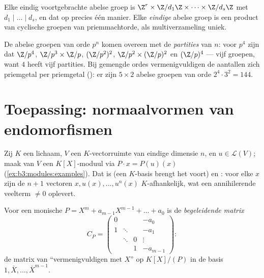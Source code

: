 \begin{corollary}
\label{cor:b3:modules:abelian}
Elke eindig voortgebrachte abelse groep is $\Z^r \times
\Z/d_1\Z\times\dots\times\Z/d_s\Z$ met $d_1 \mid \dots \mid d_s$,
en dat op precies één manier. Elke \emph{eindige} abelse groep is
een product van cyclische groepen van priemmachtorde, als
multiverzameling uniek.
\end{corollary}

\begin{example}\label{ex:b3:modules:abelian}
De abelse groepen van orde $p^n$ komen overeen met de
\emph{partities} van $n$: voor $p^4$ zijn dat $\Z/p^4$,
$\Z/p^3\times\Z/p$, $(\Z/p^2)^2$, $\Z/p^2 \times (\Z/p)^2$ en
$(\Z/p)^4$ --- vijf groepen, want $4$ heeft vijf partities. Bij
gemengde ordes vermenigvuldigen de aantallen zich priemgetal per
priemgetal (): er zijn $5 \times 2$ abelse
groepen van orde $2^4 \cdot 3^2 = 144$.
\end{example}

\section{Toepassing: normaalvormen van endomorfismen}

Zij $K$ een lichaam, $V$ een $K$-vectorruimte van eindige dimensie
$n$, en $u \in \mathcal L(V)$; maak van $V$ een $K[X]$-moduul via
$P \cdot x = P(u)(x)$ (\cref{ex:b3:modules:examples}). Dat 
is  (een $K$-basis brengt het voort) en :
voor elke $x$ zijn de $n+1$ vectoren $x, u(x), \dots, u^n(x)$
$K$-afhankelijk, wat een annihilerende veelterm $\neq 0$ oplevert.

\begin{definition}\label{def:b3:modules:companion}
Voor een monische $P = X^m + a_{m-1}X^{m-1} + \dots + a_0$ is de
\emph{begeleidende matrix}
\[
C_P = \begin{pmatrix}
0 & & & -a_0\\
1 & \ddots & & -a_1\\
& \ddots & 0 & \vdots\\
& & 1 & -a_{m-1}
\end{pmatrix} :
\]
de matrix van ``vermenigvuldigen met $X$'' op $K[X]/(P)$ in de
basis $1, \bar X, \dots, \bar X^{m-1}$.
\end{definition}

